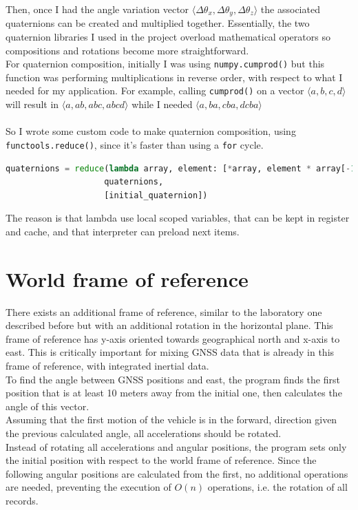 Then, once I had the angle variation vector $\langle\Delta\theta_x,\Delta\theta_y,\Delta\theta_z\rangle$ the associated quaternions can be created and multiplied together. 
Essentially, the two quaternion libraries I used in the project overload mathematical operators so compositions and rotations become more straightforward. \\
For quaternion composition, initially I was using \texttt{numpy.cumprod()} \cite{numpy-cumprod} but this function was performing multiplications in reverse order, with respect to what I needed for my application. For example, calling \texttt{cumprod()} on a vector $\langle a,b,c,d \rangle$ will result in $\langle a,ab,abc,abcd \rangle$ while I needed $\langle a,ba,cba,dcba \rangle$  \\
\\
\justify
So I wrote some custom code to make quaternion composition, using \texttt{functools.reduce()}, since it's faster than using a \texttt{for} cycle.

\begin{lstlisting}[language=Python,frame=single]
quaternions = reduce(lambda array, element: [*array, element * array[-1]], 
					quaternions, 
					[initial_quaternion])
\end{lstlisting}
The reason is that lambda use local scoped variables, that can be kept in register and cache, and that interpreter can preload next items.


\section{World frame of reference}
There exists an additional frame of reference, similar to the laboratory one described before but with an additional rotation in the horizontal plane. This frame of reference has y-axis oriented towards geographical north and x-axis to east. This is critically important for mixing GNSS data that is already in this frame of reference, with integrated inertial data. \\
To find the angle between GNSS positions and east, the program finds the first position that is at least 10 meters away from the initial one, then calculates the angle of this vector. \\
Assuming that the first motion of the vehicle is in the forward, direction given the previous calculated angle, all accelerations should be rotated. \\
Instead of rotating all accelerations and angular positions, the program sets only the initial position with respect to the world frame of reference. Since the following angular positions are calculated from the first, no additional operations are needed, preventing the execution of $O(n)$ operations, i.e. the rotation of all records.
